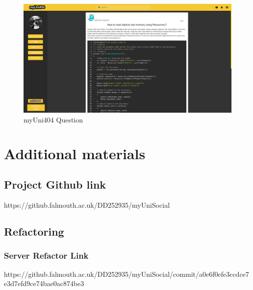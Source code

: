 \documentclass[lettersize,journal]{IEEEtran}
\begin{document}
\begin{figure}[h!]
                \includegraphics[width=0.85\paperwidth]{images/404screenshot.png}
                \caption{myUni404 Question}
                \label{figure 4}
\end{figure}

\newpage

\clearpage
\section{Additional materials}

\subsection{Project Github link}
https://github.falmouth.ac.uk/DD252935/myUniSocial

\subsection{Refactoring}
\subsubsection{Server Refactor Link}
https://github.falmouth.ac.uk/DD252935/myUniSocial/commit/a0e6f0efe3ccdce7e3d7efd9ce74bae0ac874be3
\end{document}
